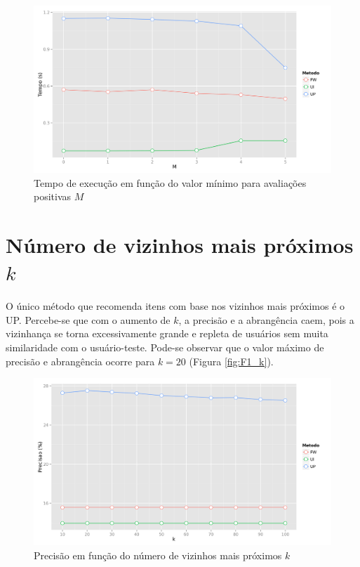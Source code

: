 \begin{figure}[htp]
    \begin{center}
    \includegraphics[width=1\textwidth]{img/time_M}
    \end{center}
    \caption{Tempo de execução em função do valor mínimo para avaliações positivas $M$}
    \label{fig:time_M}
\end{figure}

\section{Número de vizinhos mais próximos $k$} %
\label{sec:n_mero_de_vizinhos_mais_pr_ximos_}

O único método que recomenda itens com base nos vizinhos mais próximos é o UP. Percebe-se que com o aumento de $k$, a precisão e a abrangência caem, pois a vizinhança se torna excessivamente grande e repleta de usuários sem muita similaridade com o usuário-teste. Pode-se observar que o valor máximo de precisão e abrangência ocorre para $k=20$ (Figura \ref{fig:F1_k}).

\begin{figure}[htp]
    \begin{center}
    \includegraphics[width=1\textwidth]{img/precision_k}
    \end{center}
    \caption{Precisão em função do número de vizinhos mais próximos $k$}
    \label{fig:precision_k}
\end{figure}


